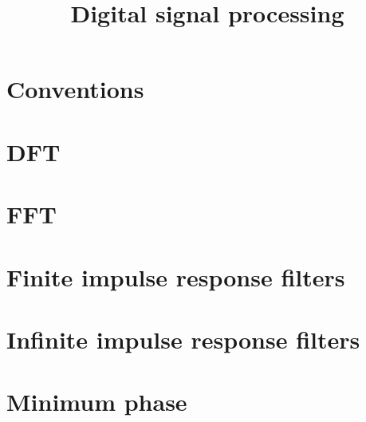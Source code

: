 \documentclass[12pt]{article}
\title{Digital signal processing}
\author{}
\begin{document}
\newcommand{\todo}[1]{\begingroup \color{red} #1\endgroup}

\newcommand{\R}{\mathbb{R}}
\newcommand{\C}{\mathbb{C}}
\newcommand{\N}{\mathbb{N}}
\newcommand{\Z}{\mathbb{Z}}
\newcommand{\Q}{\mathbb{Q}}

\newcommand{\curlyA}{\mathcal{A}}
\newcommand{\curlyB}{\mathcal{B}}
\newcommand{\curlyC}{\mathcal{C}}
\newcommand{\curlyP}{\mathcal{P}}
\newcommand{\curlyL}{\mathcal{L}}

\newcommand{\innerpr}[2]{\left\langle #1, #2 \right\rangle}
\newcommand{\norm}[1]{\left\lVert#1\right\rVert}
\newcommand{\spanof}{\operatorname{span}}
\newcommand{\rank}{\operatorname{rank}}
\newcommand{\tr}{\operatorname{tr}}
\newcommand{\Ker}{\operatorname{Ker}}
\newcommand{\Img}{\operatorname{Im}}
\newcommand{\mat}[1]{\begin{pmatrix} #1 \end{pmatrix}}

\newcommand{\ind}{\mathds{1}}
\newcommand{\dx}[1]{\, \mathrm{d}#1}
\newcommand{\ztransform}{\overset{\mathcal{Z}}{\leftrightarrow}}
\newcommand{\iztransform}{\overset{\mathcal{Z}^{-1}}{\leftrightarrow}}

\newtheorem{theorem}{Theorem}[section]
\theoremstyle{definition}
\newtheorem{definition}{Definition}[section]
\newtheorem{lemma}{Lemma}[section]
\theoremstyle{remark}
\newtheorem{remark}{Remark}[section]
\theoremstyle{remark}
\newtheorem{example}{Example}[section]


\maketitle
\tableofcontents

\newpage
\section{Conventions}


\section{DFT}


\section{FFT}


\section{Finite impulse response filters}


\section{Infinite impulse response filters}


\section{Minimum phase}


%



\end{document}
